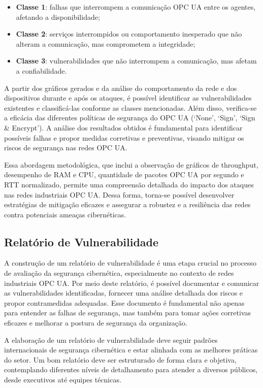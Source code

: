         \begin{itemize}
            \item \textbf{Classe 1}: falhas que interrompem a comunicação OPC UA entre os agentes, afetando a disponibilidade;
            \item \textbf{Classe 2}: serviços interrompidos ou comportamento inesperado que não alteram a comunicação, mas comprometem a integridade;
            \item \textbf{Classe 3}: vulnerabilidades que não interrompem a comunicação, mas afetam a confiabilidade.
        \end{itemize}
        
        A partir dos gráficos gerados e da análise do comportamento da rede e dos dispositivos durante e após os ataques, é possível identificar as vulnerabilidades existentes e classificá-las conforme as classes mencionadas. Além disso, verifica-se a eficácia das diferentes políticas de segurança do OPC UA (`None', `Sign', `Sign \& Encrypt'). A análise dos resultados obtidos é fundamental para identificar possíveis falhas e propor medidas corretivas e preventivas, visando mitigar os riscos de segurança nas redes OPC UA.
        
        Essa abordagem metodológica, que inclui a observação de gráficos de throughput, desempenho de RAM e CPU, quantidade de pacotes OPC UA por segundo e RTT normalizado, permite uma compreensão detalhada do impacto dos ataques nas redes industriais OPC UA. Dessa forma, torna-se possível desenvolver estratégias de mitigação eficazes e assegurar a robustez e a resiliência das redes contra potenciais ameaças cibernéticas.
    
    \subsection{Relatório de Vulnerabilidade}

        A construção de um relatório de vulnerabilidade é uma etapa crucial no processo de avaliação da segurança cibernética, especialmente no contexto de redes industriais OPC UA. Por meio deste relatório, é possível documentar e comunicar as vulnerabilidades identificadas, fornecer uma análise detalhada dos riscos e propor contramedidas adequadas. Esse documento é fundamental não apenas para entender as falhas de segurança, mas também para tomar ações corretivas eficazes e melhorar a postura de segurança da organização.

        A elaboração de um relatório de vulnerabilidade deve seguir padrões internacionais de segurança cibernética e estar alinhada com as melhores práticas do setor. Um bom relatório deve ser estruturado de forma clara e objetiva, contemplando diferentes níveis de detalhamento para atender a diversos públicos, desde executivos até equipes técnicas.
        
